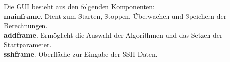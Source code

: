 \begin{samepage}
Die GUI besteht aus den folgenden Komponenten: \\
\textbf{mainframe}. Dient zum Starten, Stoppen, Überwachen und Speichern der Berechnungen.\\
\textbf{addframe}. Ermöglicht die Auswahl der Algorithmen und das Setzen der Startparameter.\\
\textbf{sshframe}. Oberfläche zur Eingabe der SSH-Daten.
\end{samepage}
